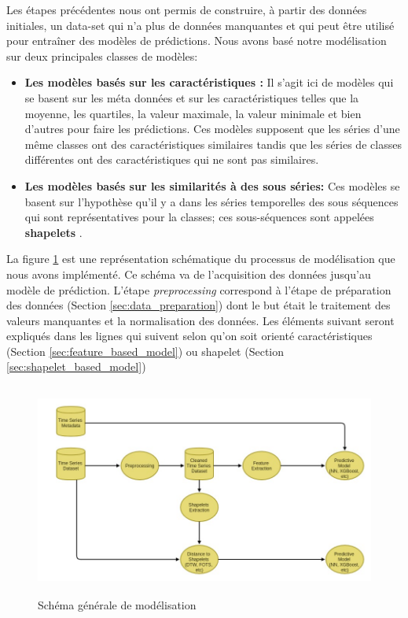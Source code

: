 Les étapes précédentes nous ont permis de construire, à partir des données initiales, un data-set qui n'a plus de données manquantes et qui peut être utilisé pour entraîner des modèles de prédictions. Nous avons basé notre modélisation sur deux principales classes de modèles:
\begin{itemize}
    \item \textbf{Les modèles basés sur les caractéristiques :} Il s'agit ici de modèles qui se basent sur les méta données et sur les caractéristiques telles que la moyenne, les quartiles, la valeur maximale, la valeur minimale et bien d'autres pour faire les prédictions. Ces modèles supposent que les séries d'une même classes ont des caractéristiques similaires tandis que les séries de classes différentes ont des caractéristiques qui ne sont pas similaires.
    \item \textbf{Les modèles basés sur les similarités à des sous séries:} Ces modèles se basent sur l'hypothèse qu'il y a dans les séries temporelles des sous séquences qui sont représentatives pour la classes; ces sous-séquences sont appelées \textbf{shapelets} \citep{ye2009time}.
\end{itemize}
La figure \ref{fig:modeling_shema} est une représentation schématique du processus de modélisation que nous avons implémenté. Ce schéma va de l'acquisition des données jusqu'au modèle de prédiction. L'étape \textit{preprocessing} correspond à l'étape de préparation des données (Section \ref{sec:data_preparation}) dont le but était le traitement des valeurs manquantes et la normalisation des données. Les éléments suivant seront expliqués dans les lignes qui suivent selon qu'on soit orienté caractéristiques (Section \ref{sec:feature_based_model}) ou shapelet (Section \ref{sec:shapelet_based_model})

\begin{figure}[!h]
    \centering
    \includegraphics[width=12cm,height=7cm]{report/figures/modeling-schema.jpg}
    \caption{Schéma générale de modélisation}
    \label{fig:modeling_shema}
\end{figure}


